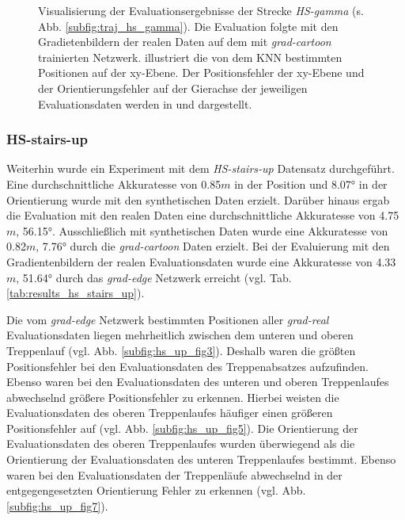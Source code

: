 \begin{figure}
\begin{tabularx}{0.9\textwidth}{>{\centering\arraybackslash}p{} X}
	\end{tabularx}
	\caption{Visualisierung der Evaluationsergebnisse der Strecke \textit{HS-gamma} (s. Abb. \ref{subfig:traj_hs_gamma}). Die Evaluation folgte mit den Gradietenbildern der realen Daten auf dem mit \textit{grad-cartoon} trainierten Netzwerk.   illustriert die von dem KNN bestimmten Positionen auf der xy-Ebene. Der Positionsfehler der xy-Ebene und der Orientierungsfehler auf der Gierachse der jeweiligen Evaluationsdaten werden in  und  dargestellt.}
	\label{fig:result_hs_gamma}
\end{figure}

\subsubsection{HS-stairs-up}
\label{subsubsec:hs_stairs_up}

Weiterhin wurde ein Experiment mit dem \textit{HS-stairs-up} Datensatz durchgeführt. Eine durchschnittliche Akkuratesse von 0.85$m$ in der Position und 8.07° in der Orientierung wurde mit den synthetischen Daten erzielt. Darüber hinaus ergab die Evaluation mit den realen Daten eine durchschnittliche Akkuratesse von 4.75$m$, 56.15°. Ausschließlich mit synthetischen Daten wurde eine Akkuratesse von 0.82$m$, 7.76° durch die \textit{grad-cartoon} Daten erzielt. Bei der Evaluierung mit den Gradientenbildern der realen Evaluationsdaten wurde eine Akkuratesse von 4.33$m$, 51.64° durch das \textit{grad-edge} Netzwerk erreicht (vgl. Tab. \ref{tab:results_hs_stairs_up}). 

Die vom \textit{grad-edge} Netzwerk bestimmten Positionen aller \textit{grad-real} Evaluationsdaten liegen mehrheitlich zwischen dem unteren und oberen Treppenlauf (vgl. Abb. \ref{subfig:hs_up_fig3}). Deshalb waren die größten Positionsfehler bei den Evaluationsdaten des Treppenabsatzes aufzufinden. Ebenso waren bei den Evaluationsdaten des unteren und oberen Treppenlaufes abwechselnd größere Positionsfehler zu erkennen. Hierbei weisten die Evaluationsdaten des oberen Treppenlaufes häufiger einen größeren Positionsfehler auf (vgl. Abb. \ref{subfig:hs_up_fig5}). Die Orientierung der Evaluationsdaten des oberen Treppenlaufes wurden überwiegend als die Orientierung der Evaluationsdaten des unteren Treppenlaufes bestimmt. Ebenso waren bei den Evaluationsdaten der Treppenläufe abwechselnd in der entgegengesetzten Orientierung Fehler zu erkennen (vgl. Abb. \ref{subfig:hs_up_fig7}).


